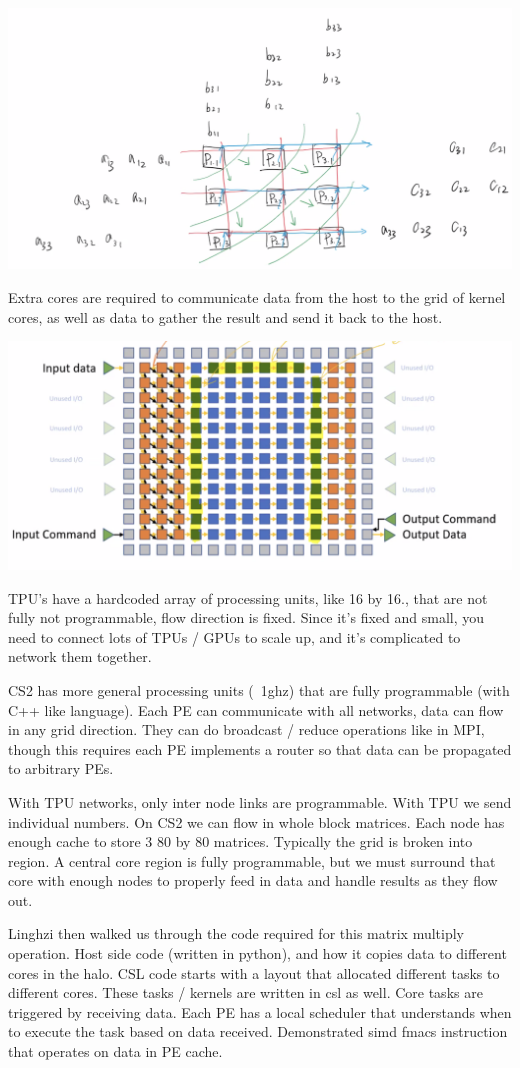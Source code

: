 \documentclass{article}
\begin{document}
\begin{center}
  \includegraphics[width=0.5\linewidth]{matrix_multiply.png}
\end{center}

Extra cores are required to communicate data from the host to the grid of kernel cores, as well as data to gather the result and send it back to the host.

\begin{center}
  \includegraphics[width=0.5\linewidth]{core_layout.png}
\end{center}

TPU's have a hardcoded array of processing units, like 16 by 16.,
that are not fully not programmable, flow direction is fixed.
Since it’s fixed and small, you need to connect lots of TPUs / GPUs to scale up, 
and it's complicated to network them together.

CS2 has more general processing units (~1ghz) that are fully programmable (with C++ like language). 
Each PE can communicate with all networks, data can flow in any grid direction. 
They can do broadcast / reduce operations like in MPI, 
though this requires each PE implements a router so that data can be propagated to arbitrary PEs.

With TPU networks, only inter node links are programmable. 
With TPU we send individual numbers.
On CS2 we can flow in whole block matrices. 
Each node has enough cache to store 3 80 by 80 matrices.
Typically the grid is broken into region.
A central core region is fully programmable, but we must surround that core with enough nodes to properly feed in data and handle results as they flow out.

Linghzi then walked us through the code required for this matrix multiply operation.
Host side code (written in python), and how it copies data to different cores in the halo.
CSL code starts with a layout that allocated different tasks to different cores.
These tasks / kernels are written in csl as well.
Core tasks are triggered by receiving data.
Each PE has a local scheduler that understands when to execute the task based on data received.
Demonstrated simd fmacs instruction that operates on data in PE cache.
\end{document}
